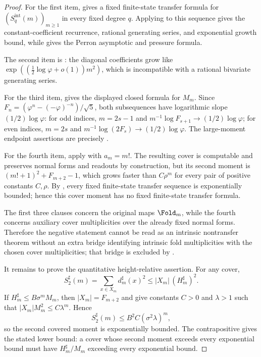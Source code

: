 \begin{proof}
For the first item,  gives a fixed
finite-state transfer formula for \((S_q^{\mathrm{int}}(m))_{m\ge1}\) in every
fixed degree \(q\).  Applying  to this
sequence gives the constant-coefficient recurrence, rational generating series,
and exponential growth bound, while
 gives the Perron asymptotic and
pressure formula.

The second item is
: the diagonal coefficients
grow like \(\exp((\frac12\log\varphi+o(1))m^2)\), which is incompatible with a
rational bivariate generating series.

For the third item,  gives the displayed
closed formula for \(M_m\).  Since
\(F_n=(\varphi^n-(-\varphi)^{-n})/\sqrt5\), both subsequences have logarithmic
slope \((1/2)\log\varphi\): for odd indices,
\(m=2s-1\) and \(m^{-1}\log F_{s+1}\to(1/2)\log\varphi\); for even indices,
\(m=2s\) and \(m^{-1}\log(2F_s)\to(1/2)\log\varphi\).  The large-moment endpoint
assertions are precisely
.

For the fourth item, apply  with
\(a_m=m!\).  The resulting cover is computable and preserves normal forms and
readouts by construction, but its second moment is
\((m!+1)^2+F_{m+2}-1\), which grows faster than \(C\rho^m\) for every pair of
positive constants \(C,\rho\).  By , every
fixed finite-state transfer sequence is exponentially bounded; hence this cover
moment has no fixed finite-state transfer formula.

The first three clauses concern the original maps \(\Fold_m\), while the fourth
concerns auxiliary cover
multiplicities over the already fixed normal forms.  Therefore the negative
statement cannot be read as an intrinsic nontransfer theorem without an extra
bridge identifying intrinsic fold multiplicities with the chosen cover
multiplicities; that bridge is excluded by
.

It remains to prove the quantitative height-relative assertion.  For any cover,
\[
  S_2^\sharp(m)=\sum_{x\in X_m}d_m^\sharp(x)^2
  \le |X_m|\,(H_m^\sharp)^2 .
\]
If \(H_m^\sharp\le B\sigma^mM_m\), then \(|X_m|=F_{m+2}\) and
 give constants
\(C>0\) and \(\lambda>1\) such that \(|X_m|M_m^2\le C\lambda^m\).  Hence
\[
  S_2^\sharp(m)\le B^2C(\sigma^2\lambda)^m,
\]
so the second covered moment is exponentially bounded.  The contrapositive gives
the stated lower bound: a cover whose second moment exceeds every exponential
bound must have \(H_m^\sharp/M_m\) exceeding every exponential bound.


\end{proof}
